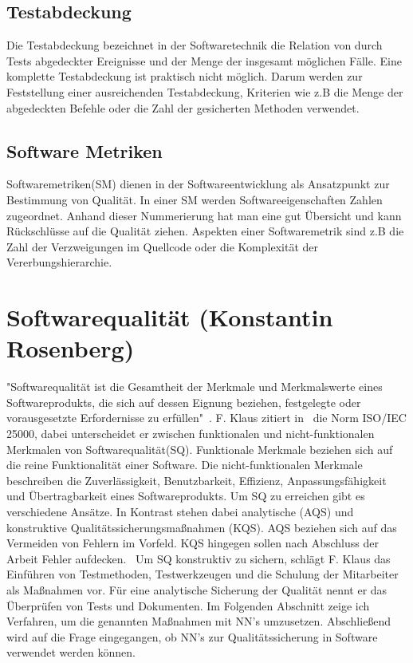 
\subsection{Testabdeckung}
Die Testabdeckung bezeichnet in der Softwaretechnik die Relation von durch Tests abgedeckter Ereignisse und der Menge der insgesamt möglichen Fälle. Eine komplette Testabdeckung ist praktisch nicht möglich. Darum werden zur Feststellung einer ausreichenden Testabdeckung, Kriterien wie z.B die Menge der abgedeckten Befehle oder die Zahl der gesicherten Methoden verwendet.~\cite{Antinyan2018}

\subsection{Software Metriken}
Softwaremetriken(SM) dienen in der Softwareentwicklung als Ansatzpunkt zur Bestimmung von Qualität. In einer SM werden Softwareeigenschaften Zahlen zugeordnet. Anhand dieser Nummerierung hat man eine gut Übersicht und kann Rückschlüsse auf die Qualität ziehen. Aspekten einer Softwaremetrik sind z.B die Zahl der Verzweigungen im Quellcode oder die Komplexität der Vererbungshierarchie.~\cite[p.~3]{Committee1998}

\section{Softwarequalität (Konstantin Rosenberg)} \label{SQ}
"Softwarequalität ist die Gesamtheit der Merkmale und Merkmalswerte eines Softwareprodukts, die sich auf dessen Eignung beziehen,
festgelegte oder vorausgesetzte
Erfordernisse zu erfüllen"~\cite[p.~20]{Franz2015}.
F. Klaus zitiert in~\cite[p.~20]{Franz2015} die Norm ISO/IEC 25000, dabei unterscheidet er zwischen funktionalen und nicht-funktionalen Merkmalen von Softwarequalität(SQ).
Funktionale Merkmale beziehen sich auf die reine Funktionalität einer Software. Die nicht-funktionalen Merkmale beschreiben die Zuverlässigkeit, Benutzbarkeit, Effizienz, Anpassungsfähigkeit und Übertragbarkeit eines Softwareprodukts.
Um SQ zu erreichen gibt es verschiedene Ansätze. In Kontrast stehen dabei analytische (AQS) und konstruktive Qualitätssicherungsmaßnahmen (KQS). AQS beziehen sich auf das Vermeiden von Fehlern im Vorfeld. KQS hingegen sollen nach Abschluss der Arbeit Fehler aufdecken.~\cite[p.~29]{Franz2015} 
Um SQ konstruktiv zu sichern, schlägt F. Klaus das Einführen von Testmethoden, Testwerkzeugen und die Schulung der Mitarbeiter als Maßnahmen vor. Für eine analytische Sicherung der Qualität nennt er das Überprüfen von Tests und Dokumenten.
Im Folgenden Abschnitt zeige ich Verfahren, um die genannten Maßnahmen mit NN's umzusetzen. Abschließend wird auf die Frage eingegangen, ob NN's zur Qualitätssicherung in Software verwendet werden können.

